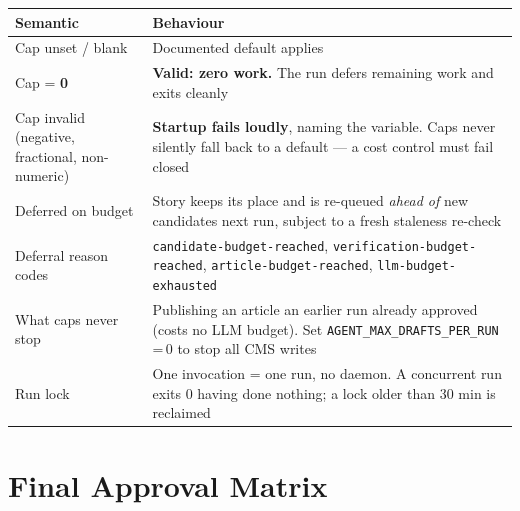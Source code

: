 \documentclass[10pt,a4paper]{article}
\newcommand{\vr}[1]{\texttt{\footnotesize\hyphenpenalty=0\exhyphenpenalty=0\relax #1}}
\newcommand{\cd}[1]{\texttt{\footnotesize\hyphenpenalty=0\exhyphenpenalty=0\relax #1}}
\newcommand{\us}{\_\discretionary{}{}{}}
\begin{document}
\begin{center}\footnotesize
\begin{tabularx}{\textwidth}{@{}>{\RaggedRight}p{4.4cm} >{\RaggedRight}X@{}}
\toprule
\textbf{Semantic} & \textbf{Behaviour} \\
\midrule
Cap unset / blank & Documented default applies \\
Cap = \textbf{0} & \textbf{Valid: zero work.} The run defers remaining work and exits cleanly \\
Cap invalid (negative, fractional, non-numeric) & \textbf{Startup fails loudly}, naming the variable. Caps never silently fall back to a default --- a cost control must fail closed \\
Deferred on budget & Story keeps its place and is re-queued \emph{ahead of} new candidates next run, subject to a fresh staleness re-check \\
Deferral reason codes & \cd{candidate-}\allowbreak\cd{budget-reached}, \cd{verification-}\allowbreak\cd{budget-reached}, \cd{article-budget-reached}, \cd{llm-budget-exhausted} \\
What caps never stop & Publishing an article an earlier run already approved (costs no LLM budget). Set \vr{AGENT\us MAX\us DRAFTS\us PER\us RUN}\,=\,0 to stop all CMS writes \\
Run lock & One invocation = one run, no daemon. A concurrent run exits 0 having done nothing; a lock older than 30 min is reclaimed \\
\bottomrule
\end{tabularx}
\end{center}

\section{Final Approval Matrix}
\end{document}
